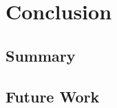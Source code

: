 \chapter{Conclusion}
\label{chap:conclusion}

\section{Summary}
\label{sec:summary}

\section{Future Work}
\label{sec:future-work}
